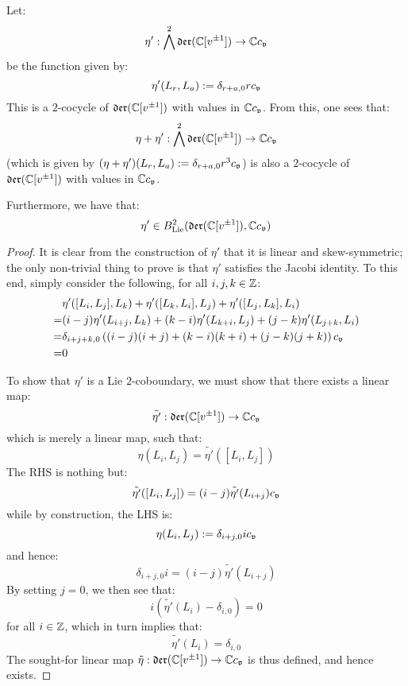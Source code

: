         \begin{proposition} \label{prop: a_virasoro_coboundary}
            Let:
                $$\eta': \bigwedge^2 \mathfrak{der}(\mathbb{C}[v^{\pm 1}]) \to \mathbb{C} c_{\mathfrak{v}}$$
            be the function given by:
                $$\eta'(L_r, L_a) := \delta_{r + a, 0} r c_{\mathfrak{v}}$$
            This is a $2$-cocycle of $\mathfrak{der}(\mathbb{C}[v^{\pm 1}])$ with values in $\mathbb{C} c_{\mathfrak{v}}$. From this, one sees that:
                $$\eta + \eta': \bigwedge^2 \mathfrak{der}(\mathbb{C}[v^{\pm 1}]) \to \mathbb{C} c_{\mathfrak{v}}$$
            (which is given by $(\eta + \eta')(L_r, L_a) := \delta_{r + a, 0} r^3 c_{\mathfrak{v}}$) is also a $2$-cocycle of $\mathfrak{der}(\mathbb{C}[v^{\pm 1}])$ with values in $\mathbb{C} c_{\mathfrak{v}}$. 
    
            Furthermore, we have that:
                $$\eta' \in B^2_{\mathrm{Lie}}( \mathfrak{der}(\mathbb{C}[v^{\pm 1}]), \mathbb{C} c_{\mathfrak{v}} )$$
        \end{proposition}
            \begin{proof}
                It is clear from the construction of $\eta'$ that it is linear and skew-symmetric; the only non-trivial thing to prove is that $\eta'$ satisfies the Jacobi identity. To this end, simply consider the following, for all $i, j, k \in \mathbb{Z}$:
                    $$
                        \begin{aligned}
                            & \eta'([L_i, L_j], L_k) + \eta'([L_k, L_i], L_j) + \eta'([L_j, L_k], L_i)
                            \\
                            = & (i - j) \eta'(L_{i + j}, L_k) + (k - i) \eta'(L_{k + i}, L_j) + (j - k) \eta'(L_{j + k}, L_i)
                            \\
                            = & \delta_{i + j + k, 0} \left( (i - j) (i + j) + (k - i) (k + i) + (j - k) (j + k) \right) c_{\mathfrak{v}}
                            \\
                            = & 0
                        \end{aligned}
                    $$
                    
                To show that $\eta'$ is a Lie $2$-coboundary, we must show that there exists a linear map:
                    $$\tilde{\eta'}: \mathfrak{der}(\mathbb{C}[v^{\pm 1}]) \to \mathbb{C} c_{\mathfrak{v}}$$
                which is merely a linear map, such that:
                    $$\eta(L_i, L_j) = \tilde{\eta'}([L_i, L_j])$$
                The RHS is nothing but:
                    $$\tilde{\eta'}([L_i, L_j]) = (i - j) \tilde{\eta'}(L_{i + j}) c_{\mathfrak{v}}$$
                while by construction, the LHS is:
                    $$\eta(L_i, L_j) := \delta_{i + j, 0} i c_{\mathfrak{v}}$$
                and hence:
                    $$\delta_{i + j, 0} i = (i - j) \tilde{\eta'}(L_{i + j})$$
                By setting $j = 0$, we then see that:
                    $$i (\tilde{\eta'}(L_i) - \delta_{i, 0}) = 0$$
                for all $i \in \mathbb{Z}$, which in turn implies that:
                    $$\tilde{\eta'}(L_i) = \delta_{i, 0}$$
                The sought-for linear map $\tilde{\eta}: \mathfrak{der}(\mathbb{C}[v^{\pm 1}]) \to \mathbb{C} c_{\mathfrak{v}}$ is thus defined, and hence exists.
            \end{proof}
